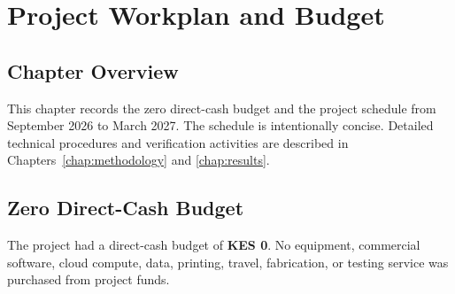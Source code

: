 \chapter{Project Workplan and Budget}
\label{chap:planning}

\section{Chapter Overview}

This chapter records the zero direct-cash budget and the project schedule from
September 2026 to March 2027. The schedule is intentionally concise. Detailed
technical procedures and verification activities are described in
Chapters~\ref{chap:methodology} and \ref{chap:results}.

\section{Zero Direct-Cash Budget}
\label{sec:budget}

The project had a direct-cash budget of \textbf{KES 0}. No equipment,
commercial software, cloud compute, data, printing, travel, fabrication, or
testing service was purchased from project funds.

